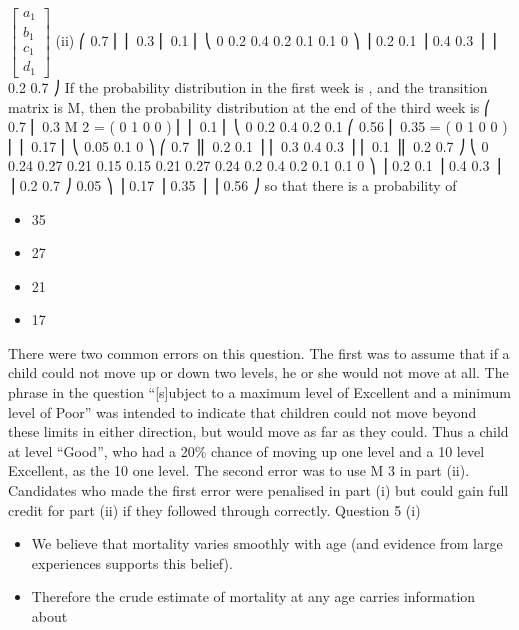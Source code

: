 \documentclass[a4paper,12pt]{article}
\begin{document}
\begin{enumerate}
$ \begin{bmatrix}
a_1 \\
b_1 \\
c_1 \\
d_1 
\end{bmatrix}  $
(ii)
⎛ 0.7
⎜
⎜ 0.3
⎜ 0.1
⎜
⎝ 0
0.2
0.4
0.2
0.1
0.1 0 ⎞
⎟
0.2 0.1 ⎟
0.4 0.3 ⎟
⎟
0.2 0.7 ⎠
If the probability distribution in the first week is \pi , and the transition matrix is M,
then the probability distribution at the end of the third week is
⎛ 0.7
⎜
0.3
\pi M 2 = ( 0 1 0 0 ) ⎜
⎜ 0.1
⎜
⎝ 0
0.2
0.4
0.2
0.1
⎛ 0.56
⎜
0.35
= ( 0 1 0 0 ) ⎜
⎜ 0.17
⎜
⎝ 0.05
0.1 0 ⎞ ⎛ 0.7
⎟⎜
0.2 0.1 ⎟ ⎜ 0.3
0.4 0.3 ⎟ ⎜ 0.1
⎟⎜
0.2 0.7 ⎠ ⎝ 0
0.24
0.27
0.21
0.15
0.15
0.21
0.27
0.24
0.2
0.4
0.2
0.1
0.1 0 ⎞
⎟
0.2 0.1 ⎟
0.4 0.3 ⎟
⎟
0.2 0.7 ⎠
0.05 ⎞
⎟
0.17 ⎟
0.35 ⎟
⎟
0.56 ⎠
so that there is a probability of
\begin{itemize}
\item 35%
\item 27%
\item 21%
\item 17%
\end{itemize} 
There were two common errors on this question. The first was to assume that if a child could
not move up or down two levels, he or she would not move at all. The phrase in the question “[s]ubject to a maximum level of Excellent and a minimum level of Poor” was intended to
indicate that children could not move beyond these limits in either direction, but would move
as far as they could. Thus a child at level “Good”, who had a 20\% chance of moving up one
level and a 10%
level Excellent, as the 10%
one level. The second error was to use \pi M 3 in part (ii). Candidates who made the first
error were penalised in part (i) but could gain full credit for part (ii) if they followed through
correctly.
\newpage
Question 5
(i)
\begin{itemize}
\item We believe that mortality varies smoothly with age (and evidence from large
experiences supports this belief).
\item Therefore the crude estimate of mortality at any age carries information about

\end{itemize}
\end{enumerate}
\end{document}
